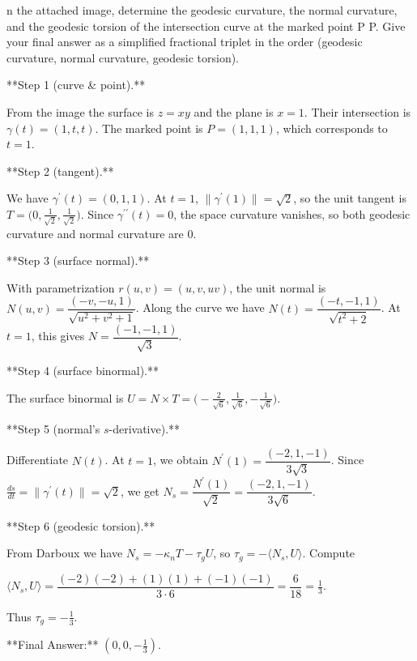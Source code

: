n the attached image, determine the geodesic curvature, the normal curvature, and the geodesic torsion of the intersection curve at the marked point 
P
P. Give your final answer as a simplified fractional triplet in the order (geodesic curvature, normal curvature, geodesic torsion).


**Step 1 (curve & point).**

  

From the image the surface is $z=xy$ and the plane is $x=1$. Their intersection is $\gamma(t)=(1,t,t)$. The marked point is $P=(1,1,1)$, which corresponds to $t=1$.

  

  

**Step 2 (tangent).**

  

We have $\gamma^{\prime}(t)=(0,1,1)$. At $t=1$, $\lVert \gamma^{\prime}(1)\rVert=\sqrt{2}$, so the unit tangent is $T=\bigl(0,\tfrac{1}{\sqrt{2}},\tfrac{1}{\sqrt{2}}\bigr)$. Since $\gamma^{\prime\prime}(t)=0$, the space curvature vanishes, so both geodesic curvature and normal curvature are $0$.

  

  

**Step 3 (surface normal).**

  

With parametrization $r(u,v)=(u,v,uv)$, the unit normal is $N(u,v)=\dfrac{(-v,-u,1)}{\sqrt{u^{2}+v^{2}+1}}$. Along the curve we have $N(t)=\dfrac{(-t,-1,1)}{\sqrt{t^{2}+2}}$. At $t=1$, this gives $N=\dfrac{(-1,-1,1)}{\sqrt{3}}$.

  

  

**Step 4 (surface binormal).**

  

The surface binormal is $U=N\times T=\bigl(-\tfrac{2}{\sqrt{6}},\tfrac{1}{\sqrt{6}},-\tfrac{1}{\sqrt{6}}\bigr)$.

  

  

**Step 5 (normal’s $s$-derivative).**

  

Differentiate $N(t)$. At $t=1$, we obtain $N^{\prime}(1)=\dfrac{(-2,1,-1)}{3\sqrt{3}}$. Since $\tfrac{ds}{dt}=\lVert\gamma^{\prime}(t)\rVert=\sqrt{2}$, we get $N_{s}=\dfrac{N^{\prime}(1)}{\sqrt{2}}=\dfrac{(-2,1,-1)}{3\sqrt{6}}$.

  

  

**Step 6 (geodesic torsion).**

  

From Darboux we have $N_{s}=-\kappa_{n}T-\tau_{g}U$, so $\tau_{g}=-\langle N_{s},U\rangle$. Compute

  

$\langle N_{s},U\rangle=\dfrac{(-2)(-2)+(1)(1)+(-1)(-1)}{3\cdot 6}=\dfrac{6}{18}=\tfrac{1}{3}$.

  

Thus $\tau_{g}=-\tfrac{1}{3}$.

**Final Answer:**  $(0,0,-\tfrac{1}{3})$.
